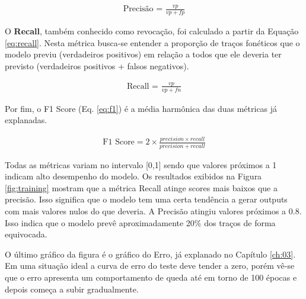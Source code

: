 \begin{align}\label{eq:precision}
\text{Precisão = } \frac{vp}{vp + fp}
\end{align}

O \textbf{Recall}, também conhecido como revocação, foi calculado a partir da Equação \ref{eq:recall}. Nesta métrica busca-se entender a proporção de traços fonéticos que o modelo previu (verdadeiros positivos) em relação a todos que ele deveria ter previsto (verdadeiros positivos + falsos negativos). 

\begin{align}\label{eq:recall}
\text{Recall = } \frac{vp}{vp + fn}
\end{align}

Por fim, o F1 Score (Eq. \ref{eq:f1}) é a média harmônica das duas métricas já explanadas.

\begin{center}
\begin{align}\label{eq:f1}
  \text{F1 Score} = 2 \times \frac{precision \times recall}{precision + recall}
  \end{align}
\end{center}

Todas as métricas variam no intervalo [0,1] sendo que valores próximos a 1 indicam alto desempenho do modelo.
Os resultados exibidos na Figura \ref{fig:training} mostram que a métrica Recall atinge scores mais baixos que a precisão. Isso significa que o modelo tem uma certa tendência a gerar outputs com mais valores nulos do que deveria. A Precisão atingiu valores próximos a 0.8. Isso indica que o modelo prevê aproximadamente 20\% dos traços de forma equivocada.

O último gráfico da figura é o gráfico do Erro, já explanado no Capítulo \ref{ch:03}. Em uma situação ideal a curva de erro do teste deve tender a zero, porém vê-se que o erro apresenta um comportamento de queda até em torno de 100 épocas e depois começa a subir gradualmente. 



